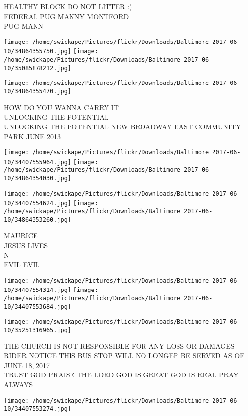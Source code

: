 \documentclass[10pt,letterpaper]{article}
\begin{document}
HEALTHY BLOCK DO NOT LITTER :)\\
FEDERAL PUG MANNY MONTFORD\\
PUG MANN
\pagebreak

\texttt{[image: /home/swickape/Pictures/flickr/Downloads/Baltimore 2017-06-10/34864355750.jpg]}
\texttt{[image: /home/swickape/Pictures/flickr/Downloads/Baltimore 2017-06-10/35085878212.jpg]}

\vspace{0.25in}
\texttt{[image: /home/swickape/Pictures/flickr/Downloads/Baltimore 2017-06-10/34864355470.jpg]}

HOW DO YOU WANNA CARRY IT\\
UNLOCKING THE POTENTIAL\\
UNLOCKING THE POTENTIAL NEW BROADWAY EAST COMMUNITY PARK JUNE 2013
\pagebreak

\texttt{[image: /home/swickape/Pictures/flickr/Downloads/Baltimore 2017-06-10/34407555964.jpg]}
\texttt{[image: /home/swickape/Pictures/flickr/Downloads/Baltimore 2017-06-10/34864354030.jpg]}

\texttt{[image: /home/swickape/Pictures/flickr/Downloads/Baltimore 2017-06-10/34407554624.jpg]}
\texttt{[image: /home/swickape/Pictures/flickr/Downloads/Baltimore 2017-06-10/34864353260.jpg]}

MAURICE\\
JESUS LIVES\\
N\\
EVIL EVIL
\pagebreak

\texttt{[image: /home/swickape/Pictures/flickr/Downloads/Baltimore 2017-06-10/34407554314.jpg]}
\texttt{[image: /home/swickape/Pictures/flickr/Downloads/Baltimore 2017-06-10/34407553684.jpg]}

\vspace{0.25in}
\texttt{[image: /home/swickape/Pictures/flickr/Downloads/Baltimore 2017-06-10/35251316965.jpg]}

THE CHURCH IS NOT RESPONSIBLE FOR ANY LOSS OR DAMAGES\\
RIDER NOTICE THIS BUS STOP WILL NO LONGER BE SERVED AS OF JUNE 18, 2017\\
TRUST GOD PRAISE THE LORD GOD IS GREAT GOD IS REAL PRAY ALWAYS
\pagebreak

\texttt{[image: /home/swickape/Pictures/flickr/Downloads/Baltimore 2017-06-10/34407553274.jpg]}
\end{document}
